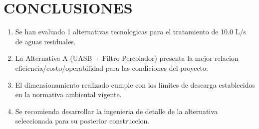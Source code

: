 \documentclass[12pt,a4paper]{article}
\begin{document}
\newpage
\section{CONCLUSIONES}

\begin{enumerate}
    \item Se han evaluado 1 alternativas tecnologicas 
    para el tratamiento de 10.0 L/s de aguas residuales.
    
    \item La Alternativa A (UASB + Filtro Percolador) presenta la mejor relacion 
    eficiencia/costo/operabilidad para las condiciones del proyecto.
    
    \item El dimensionamiento realizado cumple con los limites de descarga 
    establecidos en la normativa ambiental vigente.
    
    \item Se recomienda desarrollar la ingenieria de detalle de la alternativa 
    seleccionada para su posterior construccion.
\end{enumerate}


\end{document}
